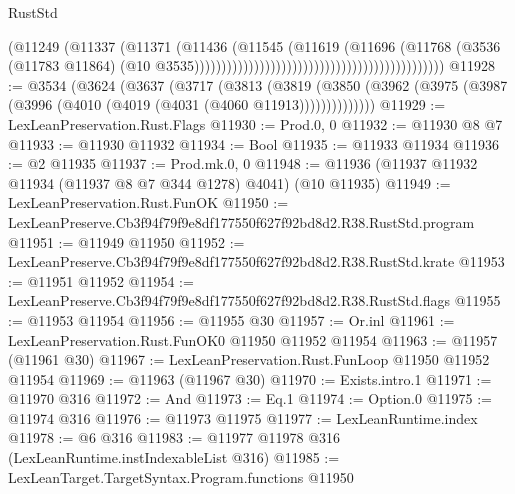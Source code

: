 \begin{lexlean}{RustStd}
\begin{coremodule}
                                                                            (@11249
                                                                              (@11337
                                                                                (@11371
                                                                                  (@11436
                                                                                    (@11545
                                                                                      (@11619
                                                                                        (@11696
                                                                                          (@11768
                                                                                            (@3536
                                                                                              (@11783
                                                                                                @11864)
                                                                                              (@10
                                                                                                @3535))))))))))))))))))))))))))))))))))))))))))))))
@11928 := @3534
    (@3624
      (@3637
        (@3717
          (@3813
            (@3819
              (@3850 (@3962 (@3975 (@3987 (@3996 (@4010 (@4019 (@4031 (@4060 @11913))))))))))))))
@11929 := LexLeanPreservation.Rust.Flags
@11930 := Prod.{0, 0}
@11932 := @11930 @8 @7
@11933 := @11930 @11932
@11934 := Bool
@11935 := @11933 @11934
@11936 := @2 @11935
@11937 := Prod.mk.{0, 0}
@11948 := @11936 (@11937 @11932 @11934 (@11937 @8 @7 @344 @1278) @4041) (@10 @11935)
@11949 := LexLeanPreservation.Rust.FunOK
@11950 := LexLeanPreserve.Cb3f94f79f9e8df177550f627f92bd8d2.R38.RustStd.program
@11951 := @11949 @11950
@11952 := LexLeanPreserve.Cb3f94f79f9e8df177550f627f92bd8d2.R38.RustStd.krate
@11953 := @11951 @11952
@11954 := LexLeanPreserve.Cb3f94f79f9e8df177550f627f92bd8d2.R38.RustStd.flags
@11955 := @11953 @11954
@11956 := @11955 @30
@11957 := Or.inl
@11961 := LexLeanPreservation.Rust.FunOK0 @11950 @11952 @11954
@11963 := @11957 (@11961 @30)
@11967 := LexLeanPreservation.Rust.FunLoop @11950 @11952 @11954
@11969 := @11963 (@11967 @30)
@11970 := Exists.intro.{1}
@11971 := @11970 @316
@11972 := And
@11973 := Eq.{1}
@11974 := Option.{0}
@11975 := @11974 @316
@11976 := @11973 @11975
@11977 := LexLeanRuntime.index
@11978 := @6 @316
@11983 := @11977 @11978 @316 (LexLeanRuntime.instIndexableList @316)
@11985 := LexLeanTarget.TargetSyntax.Program.functions @11950

\end{coremodule}
\end{lexlean}
